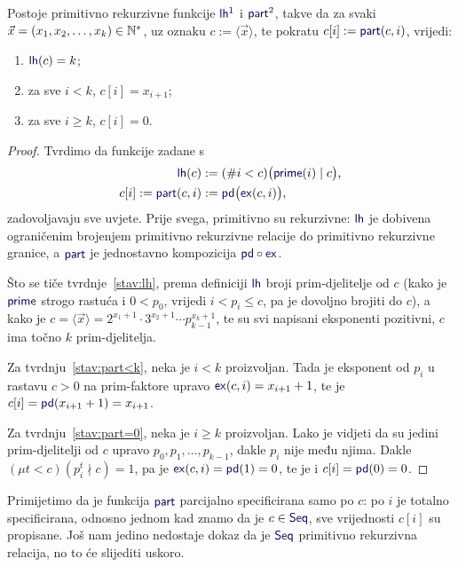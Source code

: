 \begin{propozicija}\label{prop:lhpartprn}
Postoje primitivno rekurzivne funkcije $\f{lh}^1$ i $\f{part}^2$, takve da za svaki $\vec x=(x_1,x_2,\dotsc,x_k)\in{\mathbb N}^*$, uz oznaku $c:=\langle\vec x\rangle$, te pokratu $c[i]:=\f{part}(c,i)$, vrijedi:
\begin{enumerate}
    \item\label{stav:lh} $\f{lh}(c)=k$;
    \item\label{stav:part<k} za sve $i<k$, $c[i]=x_{i+1}$;
    \item\label{stav:part=0} za sve $i\ge k$, $c[i]=0$.
\end{enumerate}
\end{propozicija}
\begin{proof}
Tvrdimo da funkcije zadane s
\begin{align}
\f{lh}(c)&:=(\#i<c)\bigl(\f{prime}(i)\mid c\bigr)\text,\\
c[i]:=\f{part}(c,i)&:=\f{pd}\bigl(\f{ex}(c,i)\bigr)\text,
\end{align}
zadovoljavaju sve uvjete. Prije svega, primitivno su rekurzivne: $\f{lh}$ je dobivena og\-ra\-ni\-če\-nim brojenjem primitivno rekurzivne relacije do primitivno rekurzivne granice, a $\f{part}$ je jednostavno kompozicija $\f{pd}\circ\f{ex}$.

Što se tiče tvrdnje~\ref{stav:lh}, prema definiciji $\f{lh}$ broji prim-djelitelje od $c$ (kako je $\f{prime}$ strogo rastuća i $0<p_0$, vrijedi $i<p_i\le c$, pa je dovoljno brojiti do $c$), a kako je $c=\langle\vec x\rangle=2^{x_1+1}\cdot3^{x_2+1}\dotsm p_{k-1}^{x_k+1}$, te su svi napisani eksponenti pozitivni, $c$ ima točno $k$ prim-djelitelja.

Za tvrdnju~\ref{stav:part<k}, neka je $i<k$ proizvoljan. Tada je eksponent od $p_i$ u rastavu $c>0$ na prim-faktore upravo $\f{ex}(c,i)=x_{i+1}+1$, te je $c[i]=\f{pd}(x_{i+1}+1)=x_{i+1}$.

Za tvrdnju~\ref{stav:part=0}, neka je $i\ge k$ proizvoljan. Lako je vidjeti da su jedini prim-djelitelji od $c$ upravo $p_0,p_1,\dotsc,p_{k-1}$, dakle $p_i$ nije među njima. Dakle $(\mu t<c)(p_i^t\nmid c)=1$, pa je $\f{ex}(c,i)=\f{pd}(1)=0$, te je i $c[i]=\f{pd}(0)=0$.
\end{proof}

Primijetimo da je funkcija $\f{part}$ parcijalno specificirana samo po $c$: po $i$ je totalno specificirana, odnosno jednom kad znamo da je $c\in\f{Seq}$, sve vrijednosti $c[i]$ su propisane. Još nam jedino nedostaje dokaz da je $\f{Seq}$ primitivno rekurzivna relacija, no to će slijediti uskoro.

